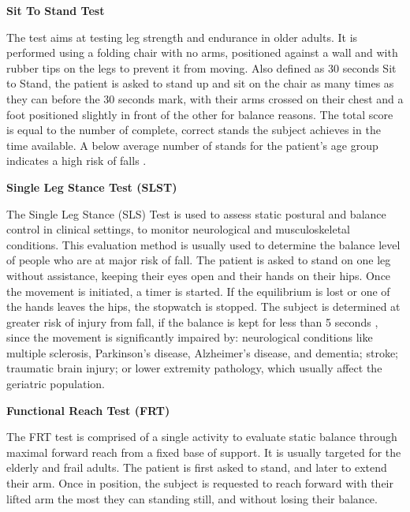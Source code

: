 \vspace{0.3cm}
\textbf{Sit To Stand Test} %

The test aims at testing leg strength and endurance in older adults. It is performed using a folding chair with no arms, positioned against a wall and with rubber tips on the legs to prevent it from moving. Also defined as 30 seconds Sit to Stand, the patient is asked to stand up and sit on the chair as many times as they can before the 30 seconds mark, with their arms crossed on their chest and a foot positioned slightly in front of the other for balance reasons. 
The total score is equal to the number of complete, correct stands the subject achieves in the time available. 
A below average number of stands for the patient’s age group indicates a high risk of falls \cite{SittoStand}.
 
 
 
\vspace{0.3cm}
\textbf{Single Leg Stance Test (SLST)} %

The Single Leg Stance (SLS) Test is used to assess static postural and balance control in clinical settings, 
to monitor neurological and musculoskeletal conditions.
This evaluation method is usually used to determine the balance level of people who are at major risk of fall. 
The patient is asked to stand on one leg without assistance, keeping their eyes open and their hands on their hips. 
Once the movement is initiated, a timer is started.
If the equilibrium is lost or one of the hands leaves the hips, the stopwatch is stopped. 
The subject is determined at greater risk of injury from fall, if the balance is kept for less than 5 seconds \cite{SingleLeg}, 
since the movement is significantly impaired by: neurological conditions like multiple sclerosis, Parkinson’s disease, 
Alzheimer’s disease, and dementia; 
stroke; traumatic brain injury; or lower extremity pathology, which usually affect the geriatric population.

\vspace{0.3cm} %
\textbf{Functional Reach Test (FRT)}

The FRT test is comprised of a single activity to evaluate static balance through maximal forward reach from a fixed base of support. It is usually targeted for the elderly and frail adults.
The patient is first asked to stand, and later to extend their arm. Once in position, the subject is requested to reach forward with their lifted arm the most they can standing still, and without losing their balance. 

